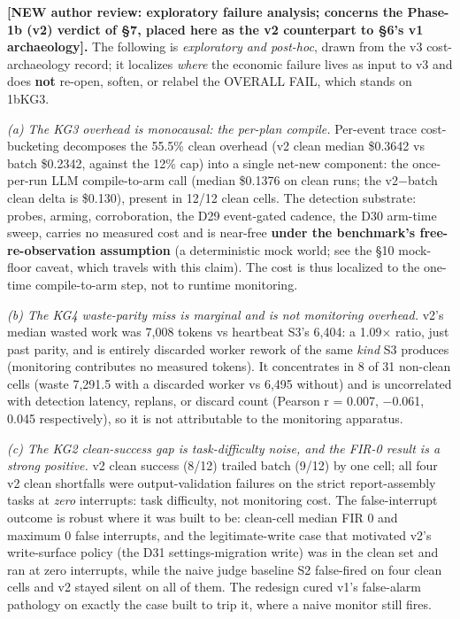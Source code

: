 \documentclass[acmsmall,screen,review,anonymous]{acmart}
\renewenvironment{leftbar}{%
  \def\FrameCommand{\hspace{2pt}{\color{lbcol}\vrule width 1.5pt}\hspace{8pt}}%
  \MakeFramed{\advance\hsize-\width \FrameRestore}\small}%
  {\endMakeFramed}
\begin{document}
\begin{leftbar}
\textbf{[NEW \textperiodcentered{} author review: exploratory failure analysis; concerns the Phase-1b (v2) verdict of \S7, placed here as the v2 counterpart to \S6's v1 archaeology].} The following is \emph{exploratory and post-hoc}, drawn from the v3 cost-archaeology record; it localizes \emph{where} the economic failure lives as input to v3 and does \textbf{not} re-open, soften, or relabel the OVERALL FAIL, which stands on 1bKG3.

\emph{(a) The KG3 overhead is monocausal: the per-plan compile.} Per-event trace cost-bucketing decomposes the 55.5\% clean overhead (v2 clean median \$0.3642 vs batch \$0.2342, against the 12\% cap) into a single net-new component: the once-per-run LLM compile-to-arm call (median \$0.1376 on clean runs; the v2$-$batch clean delta is \$0.130), present in 12/12 clean cells. The detection substrate: probes, arming, corroboration, the D29 event-gated cadence, the D30 arm-time sweep, carries no measured cost and is near-free \textbf{under the benchmark's free-re-observation assumption} (a deterministic mock world; see the \S10 mock-floor caveat, which travels with this claim). The cost is thus localized to the one-time compile-to-arm step, not to runtime monitoring.

\emph{(b) The KG4 waste-parity miss is marginal and is not monitoring overhead.} v2's median wasted work was 7,008 tokens vs heartbeat S3's 6,404: a 1.09$\times$ ratio, just past parity, and is entirely discarded worker rework of the same \emph{kind} S3 produces (monitoring contributes no measured tokens). It concentrates in 8 of 31 non-clean cells (waste 7,291.5 with a discarded worker vs 6,495 without) and is uncorrelated with detection latency, replans, or discard count (Pearson r = 0.007, $-$0.061, 0.045 respectively), so it is not attributable to the monitoring apparatus.

\emph{(c) The KG2 clean-success gap is task-difficulty noise, and the FIR-0 result is a strong positive.} v2 clean success (8/12) trailed batch (9/12) by one cell; all four v2 clean shortfalls were output-validation failures on the strict report-assembly tasks at \emph{zero} interrupts: task difficulty, not monitoring cost. The false-interrupt outcome is robust where it was built to be: clean-cell median FIR 0 and maximum 0 false interrupts, and the legitimate-write case that motivated v2's write-surface policy (the D31 settings-migration write) was in the clean set and ran at zero interrupts, while the naive judge baseline S2 false-fired on four clean cells and v2 stayed silent on all of them. The redesign cured v1's false-alarm pathology on exactly the case built to trip it, where a naive monitor still fires.

\end{leftbar}
\end{document}

